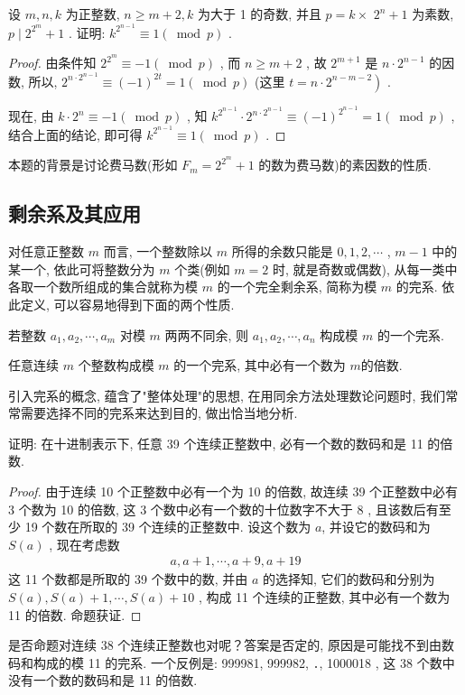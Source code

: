 \begin{example}
	设 $m ,  n ,  k$ 为正整数,  $n \geqslant m+2, k$ 为大于 1 的奇数, 并且 $p=k \times$ $2^{n}+1$ 为素数,  $p \mid 2^{2^{m}}+1$ . 证明:  $k^{2^{n-1}} \equiv 1(\bmod p)$ .
\end{example}
\begin{proof}
	由条件知 $2^{2^{m}} \equiv-1(\bmod p)$ , 而 $n \geqslant m+2$ , 故 $2^{m+1}$ 是 $n \cdot 2^{n-1}$ 的因数, 所以,  $2^{n \cdot 2^{n-1}} \equiv(-1)^{2 t}=1(\bmod p)$ (这里 $\left.t=n \cdot 2^{n-m-2}\right)$ .

	现在, 由 $k \cdot 2^{n} \equiv-1(\bmod p)$ , 知 $k^{2^{n-1}} \cdot 2^{n \cdot 2^{n-1}} \equiv(-1)^{2^{n-1}}=1(\bmod p)$ , 结合上面的结论, 即可得 $k^{2^{n-1}} \equiv 1(\bmod p)$ .
\end{proof}
\begin{note}
	本题的背景是讨论费马数(形如 $F_{m}=2^{2^{m}}+1$ 的数为费马数)的素因数的性质.
\end{note}


\subsection{剩余系及其应用}
对任意正整数 $m$ 而言, 一个整数除以 $m$ 所得的余数只能是 $0,1,2, \cdots$ ,  $m-1$ 中的某一个, 依此可将整数分为 $m$ 个类(例如 $m=2$ 时, 就是奇数或偶数), 从每一类中各取一个数所组成的集合就称为模 $m$ 的一个完全剩余系, 简称为模 $m$ 的完系. 依此定义, 可以容易地得到下面的两个性质.

\begin{property}
	若整数 $a_{1}, a_{2}, \cdots, a_{m}$ 对模 $m$ 两两不同余, 则 $a_{1}, a_{2}, \cdots, a_{n}$ 构成模 $m$ 的一个完系.
\end{property}

\begin{property}
	任意连续 $m$ 个整数构成模 $m$ 的一个完系, 其中必有一个数为 $m$的倍数.
\end{property}

引入完系的概念, 蕴含了"整体处理"的思想, 在用同余方法处理数论问题时, 我们常常需要选择不同的完系来达到目的, 做出恰当地分析.

\begin{example}
	证明: 在十进制表示下, 任意 39 个连续正整数中, 必有一个数的数码和是 11 的倍数.
\end{example}
\begin{proof}
	由于连续 10 个正整数中必有一个为 10 的倍数, 故连续 39 个正整数中必有 3 个数为 10 的倍数, 这 3 个数中必有一个数的十位数字不大于 8 , 且该数后有至少 19 个数在所取的 39 个连续的正整数中. 设这个数为 $a$, 并设它的数码和为 $S(a)$ , 现在考虑数
	\begin{align*}
		a, a+1, \cdots, a+9, a+19
	\end{align*}
	这 11 个数都是所取的 39 个数中的数, 并由 $a$ 的选择知, 它们的数码和分别为 $S(a), S(a)+1, \cdots, S(a)+10$ , 构成 11 个连续的正整数, 其中必有一个数为 11 的倍数. 命题获证.
\end{proof}
\begin{note}
	是否命题对连续 38 个连续正整数也对呢？答案是否定的, 原因是可能找不到由数码和构成的模 11 的完系. 一个反例是: 999981, 999982, ․, 1000018 , 这 38 个数中没有一个数的数码和是 11 的倍数.
\end{note}


